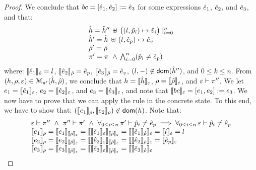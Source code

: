 \begin{proof}
\noindent{}
We conclude that  $\bcmd = [\sexpr_1, \sexpr_2] := \sexpr_3$ for some expressions $\sexpr_1$, $\sexpr_2$, 
and $\sexpr_3$, and that: 
$$
\begin{array}{l}
  \sheap =   \sheap'' \, \uplus \, \big((l, \sexprp_i) \mapsto \sexprv_i\big)\mid_{i = 0}^n     \\
  \sheap' =  \sheap \, \uplus \,  (l, \sexpr_p) \mapsto \sexpr_v  \\
  \sstore' = \sstore \\ 
    \pc' = \pc \ \wedge \, \bigwedge_{i = 0}^n (\sexprp_i \neq \sexpr_p)
\end{array}
$$ 
where: $\symbeval{\sexpr_1}{\sstore} =  \loc$, $\symbeval{\sexpr_2}{\sstore} =  \sexpr_p$, 
$\symbeval{\sexpr_3}{\sstore} =  \sexpr_v$,  $(\loc, -) \not\in \domain(\sheap'')$, 
and $0 \leq k \leq n$. 
From $(\heap, \store, \senv) \in \smodels{\sheap, \sstore}{\pc'}$, we conclude that $\heap = \semexpr{\sheap}{\senv}$, $\store = \semexpr{\sstore}{\senv}$, and 
$\senv \vdash \pc''$. 
We let $\jsilexpr_1 = \symbeval{\sexpr_1}{\senv}$, 
$\jsilexpr_2 = \symbeval{\sexpr_2}{\senv}$, and $\jsilexpr_3 = \symbeval{\sexpr_3}{\senv}$, and note that $\symbeval{\bcmd}{\senv} = [\jsilexpr_1, \jsilexpr_2] := \jsilexpr_3$.
We now have to prove that we can apply the  rule in the concrete state.
To this end, we have to show that:
$(\symbeval{\jsilexpr_1}{\store}, \symbeval{\jsilexpr_2}{\store}) \not\in \domain(\heap)$. 
Note that: 
$$
\begin{array}{l}
%
\senv \vdash \pc'' \ \wedge \ \pc'' \vdash \pc' \ \wedge \ \forall_{0 \leq i \leq n}  \, \pc' \vdash \sexprp_i \neq \sexpr_p  
      \implies \forall_{0 \leq i \leq n}  \, \senv \vdash \sexprp_i \neq \sexpr_p  \\
%
 \symbeval{\jsilexpr_1}{\store} = \symbeval{\jsilexpr_1}{\symbeval{\sstore}{\senv}} = \symbeval{\symbeval{\sexpr_1}{\senv}}{\symbeval{\sstore}{\senv}} = \symbeval{\symbeval{\sexpr_1}{\sstore}}{\senv} 
    = \symbeval{\loc}{\senv} = \loc \\ 
  \symbeval{\jsilexpr_2}{\store}  = \symbeval{\jsilexpr_2}{\semexpr{\sstore}{\senv}} =  \symbeval{\symbeval{\sexpr_2}{\senv}}{\symbeval{\sstore}{\senv}} = \symbeval{\symbeval{\sexpr_2}{\sstore}}{\senv}
   =  \symbeval{\sexpr_p}{\senv} \\
  \symbeval{\jsilexpr_3}{\store}  = \symbeval{\jsilexpr_3}{\semexpr{\sstore}{\senv}} =  \symbeval{\symbeval{\sexpr_3}{\senv}}{\symbeval{\sstore}{\senv}} = \symbeval{\symbeval{\sexpr_3}{\sstore}}{\senv}

\end{array}$$
\end{proof}
